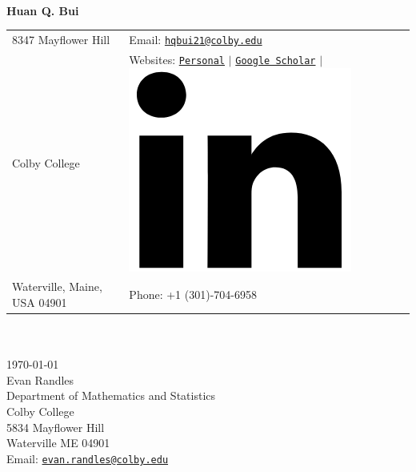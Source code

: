 \documentclass[10pt]{article}
\begin{document}
\noindent  
\begin{center}
\hrulefill\\
\vspace{+5pt}
{\Huge{\textbf{Huan Q. Bui}}}
\end{center}
\vspace{-10pt}
\vspace{-1ex}
\normalsize
\begin{center}
\begin{tabular}{l l}
     8347 Mayflower Hill 		 & \hspace{1in} Email: \href{mailto:hqbui21@colby.edu}{\texttt{hqbui21@colby.edu}} \\
     Colby College 				 & \hspace{1in}  Websites: \href{www.huanqbui.com}{\texttt{Personal}} 
     $\vert$ 	\href{https://scholar.google.com/citations?user=ejxM5pkAAAAJ\&hl=en}{\texttt{Google Scholar}} 
     $\vert$ 					\href{https://www.linkedin.com/in/huan-bui/}{\includegraphics[scale=0.04]{linkedin_logo.PNG}} \\
 	Waterville, Maine, USA 04901 & \hspace{1in} Phone: +1 (301)-704-6958\\
\end{tabular}
\end{center}
\vspace{-1ex}
\hrulefill

\normalsize
$\,$\\
$\,$\\
\noindent \today\\


\noindent Evan Randles\\
Department of Mathematics and Statistics\\
Colby College\\
5834 Mayflower Hill\\
Waterville ME 04901\\
Email: \href{mailto:evan.randles@colby.edu}{\texttt{evan.randles@colby.edu}}\\
\end{document}
